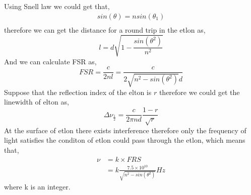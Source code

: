\documentclass{article}
\begin{document}
Using Snell law we could get that,
\begin{equation}\label{key}
	\begin{array}{l}
	 sin(\theta)=nsin(\theta_1)\\
	\end{array}
\end{equation}
therefore we can get the distance for a round trip in the etlon as,
\begin{equation}\label{key}
l=d\sqrt{1-\frac{sin(\theta^2)}{n^2}}
\end{equation}
And we can calculate FSR as,
\begin{equation}\label{key}
	FSR=\frac{c}{2nl}=\frac{c}{2\sqrt{n^2-sin(\theta^2)}d}
\end{equation}
Suppose that the reflection index of the elton is $r$ therefore we could get the linewidth of elton as,
\begin{equation}\label{key}
\Delta \nu_{\frac{1}{2}}=\frac{c}{2\pi nd}\frac{1-r}{\sqrt{r}}
\end{equation}
At the surface of etlon there exists interference therefore only the frequency of light satisfies the conditon of etlon could pass through the etlon, which means that,
\begin{equation}\label{key}
	\begin{aligned}
	\nu&=k\times FRS
	\\
	&=k\frac{7.5\times 10^{10}}{\sqrt{n^2-sin(\theta^2)}}Hz
	\end{aligned}
\end{equation}
where k is an integer.
\end{document}
